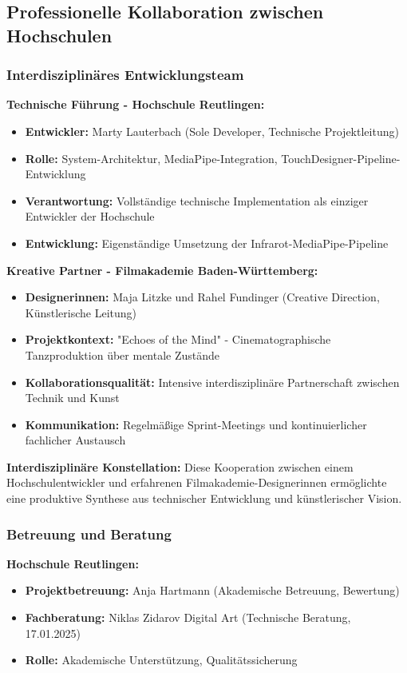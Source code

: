 \subsection{Professionelle Kollaboration zwischen Hochschulen}

\subsubsection{Interdisziplinäres Entwicklungsteam}

\textbf{Technische Führung - Hochschule Reutlingen:}
\begin{itemize}
    \item \textbf{Entwickler:} Marty Lauterbach (Sole Developer, Technische Projektleitung)
    \item \textbf{Rolle:} System-Architektur, MediaPipe-Integration, TouchDesigner-Pipeline-Entwicklung
    \item \textbf{Verantwortung:} Vollständige technische Implementation als einziger Entwickler der Hochschule
    \item \textbf{Entwicklung:} Eigenständige Umsetzung der Infrarot-MediaPipe-Pipeline
\end{itemize}

\textbf{Kreative Partner - Filmakademie Baden-Württemberg:}
\begin{itemize}
    \item \textbf{Designerinnen:} Maja Litzke und Rahel Fundinger (Creative Direction, Künstlerische Leitung)
    \item \textbf{Projektkontext:} "Echoes of the Mind" - Cinematographische Tanzproduktion über mentale Zustände
    \item \textbf{Kollaborationsqualität:} Intensive interdisziplinäre Partnerschaft zwischen Technik und Kunst
    \item \textbf{Kommunikation:} Regelmäßige Sprint-Meetings und kontinuierlicher fachlicher Austausch
\end{itemize}

\textbf{Interdisziplinäre Konstellation:}
Diese Kooperation zwischen einem Hochschulentwickler und erfahrenen Filmakademie-Designerinnen ermöglichte eine produktive Synthese aus technischer Entwicklung und künstlerischer Vision.

\subsubsection{Betreuung und Beratung}

\textbf{Hochschule Reutlingen:}
\begin{itemize}
    \item \textbf{Projektbetreuung:} Anja Hartmann (Akademische Betreuung, Bewertung)
    \item \textbf{Fachberatung:} Niklas Zidarov Digital Art (Technische Beratung, 17.01.2025)
    \item \textbf{Rolle:} Akademische Unterstützung, Qualitätssicherung
\end{itemize}

